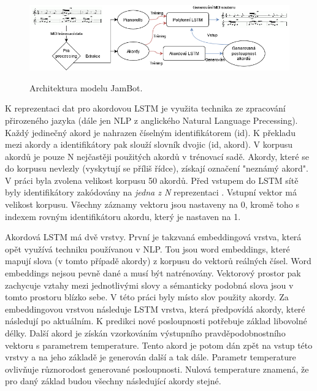 \begin{figure}[h]\centering
    \centering
    \includegraphics[width=1\linewidth]{obrazky/JambotArchitecture.png}\\[1pt]  
    \caption{Architektura modelu JamBot. \cite{Brunner_Jambot}}    
    \label{obrazekArchitekturaJambot}
\end{figure}

K reprezentaci dat pro akordovou LSTM 
je využita technika ze zpracování přirozeného jazyka 
(dále jen NLP z anglického Natural Language Precessing).
Každý jedinečný akord je nahrazen číselným identifikátorem (id).
K překladu mezi akordy a identifikátory pak slouží slovník dvojic (id, akord).
V korpusu akordů je pouze N nejčastěji použitých akordů v trénovací sadě.
Akordy, které se do korpusu nevlezly (vyskytují se příliš řídce),
získají označení "neznámý akord".
V práci byla zvolena velikost korpusu 50 akordů.
Před vstupem do LSTM sítě byly identifikátory 
zakódovány na \emph{jedna z N} reprezentaci
.
Vstupní vektor má velikost korpusu.
Všechny záznamy vektoru jsou nastaveny na 0,
kromě toho s indexem rovným identifikátoru akordu,
který je nastaven na 1.
\par
Akordová LSTM má dvě vrstvy.
První je takzvaná embeddingová vrstva,
která opět využívá techniku používanou v NLP.
Tou jsou word embeddings, které mapují slova (v tomto případě akordy)
z korpusu do vektorů reálných čísel.
Word embeddings nejsou pevně dané a musí být natrénovány.
Vektorový prostor pak zachycuje vztahy mezi jednotlivými slovy
a sémanticky podobná slova jsou v tomto prostoru blízko sebe.
V této práci byly místo slov použity akordy.
Za embeddingovou vrstvou následuje LSTM vrstva,
která předpovídá akordy, které následují po aktuálním.
K predikci nové posloupnosti potřebuje základ libovolné délky.
Další akord je získán vzorkováním výstupního pravděpodobnostního vektoru
s parametrem temperature.
Tento akord je potom dán zpět na vstup této vrstvy
a na jeho základě je generován další a tak dále.
Parametr temperature ovlivňuje různorodost generované posloupnosti.
Nulová temperature znamená, že pro daný základ 
budou všechny následující akordy stejné.
\par

